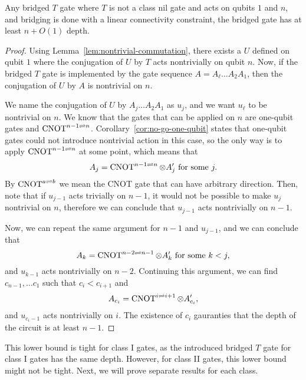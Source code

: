 \begin{proposition}\label{prop:no-go-depth}
    Any bridged $T$ gate where $T$ is not a class nil gate and acts on qubits $1$ and $n$, and bridging is done with a linear connectivity constraint, the bridged gate has at least $n + O(1)$ depth.
\end{proposition}
\begin{proof}
  Using Lemma~\ref{lem:nontrivial-commutation}, there exists a $U$ defined on qubit $1$ where the conjugation of $U$ by $T$ acts nontrivially on qubit $n$. Now, if the bridged $T$ gate is implemented by the gate sequence $A = A_\ell \dots A_2 A_1$, then the conjugation of $U$ by $A$ is nontrivial on $n$. 

  We name the conjugation of $U$ by $A_j \dots A_2 A_1$ as $u_j$, and we want $u_\ell$ to be nontrivial on $n$. We know that the gates that can be applied on $n$ are one-qubit gates and $\operatorname{CNOT}^{n-1\rightleftharpoons n}$. Corollary~\ref{cor:no-go-one-qubit} states that one-qubit gates could not introduce nontrivial action in this case, so the only way is to apply $\operatorname{CNOT}^{n-1\rightleftharpoons n}$ at some point, which means that
  \begin{equation}
    A_j = \operatorname{CNOT}^{n-1\rightleftharpoons n} \otimes A'_{j} \text{ for some } j.
  \end{equation}
  By $\operatorname{CNOT}^{a \rightleftharpoons b}$ we mean the CNOT gate that can have arbitrary direction. Then, note that if $u_{j-1}$ acts trivially on $n-1$, it would not be possible to make $u_j$ nontrivial on $n$, therefore we can conclude that $u_{j-1}$ acts nontrivially on $n-1$. 

  Now, we can repeat the same argument for $n-1$ and $u_{j-1}$, and we can conclude that
  \begin{equation} 
    A_k = \operatorname{CNOT}^{n-2\rightleftharpoons n-1} \otimes A'_{k} \text{ for some } k < j,
  \end{equation}
  and $u_{k-1}$ acts nontrivially on $n-2$. Continuing this argument, we can find $c_{n-1}, \dots c_1$ such that $c_i < c_{i+1}$ and
  \begin{equation}
    A_{c_i} = \operatorname{CNOT}^{i\rightleftharpoons i+1} \otimes A'_{c_i},
  \end{equation}
  and $u_{c_i-1}$ acts nontrivially on $i$.
  The existence of $c_i$ gauranties that the depth of the circuit is at least $n-1$.
\end{proof}

This lower bound is tight for class I gates, as the introduced bridged $T$ gate for class I gates has the same depth. However, for class II gates, this lower bound might not be tight. Next, we will prove separate results for each class.


